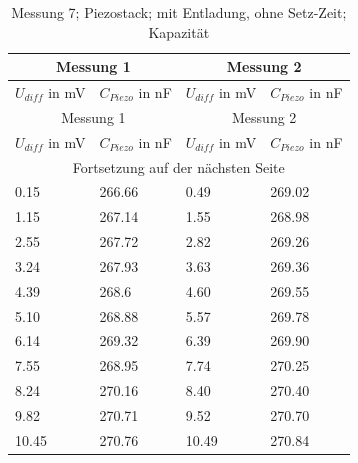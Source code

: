 \documentclass[12pt]{scrreprt} %
\begin{document}
\setlongtables
\begin{longtable}{| l | l | l | l |}
\caption[Messung 7; ohne Setz-Zeit; Kapazität]{Messung 7; Piezostack; mit Entladung, ohne Setz-Zeit; Kapazität}\\
\hline
\multicolumn{2}{|c|}{Messung 1} &\multicolumn{2}{|c|}{Messung 2}\\
\hline
$U_{diff}$ in mV&$C_{Piezo}$ in nF&$U_{diff}$ in mV&$C_{Piezo}$ in nF\\
\hline
\endfirsthead
\hline
\multicolumn{2}{|c|}{Messung 1} &\multicolumn{2}{|c|}{Messung 2}\\
\hline
$U_{diff}$ in mV&$C_{Piezo}$ in nF&$U_{diff}$ in mV&$C_{Piezo}$ in nF\\
\hline
\endhead
\hline
\multicolumn{4}{|c|}{Fortsetzung auf der nächsten Seite}\\
\hline
\endfoot
\hline \hline
\endlastfoot
\hline
\label{tab:2.7}%
0.15&266.66&0.49&269.02\\
1.15&267.14&1.55&268.98\\
2.55&267.72&2.82&269.26\\
3.24&267.93&3.63&269.36\\
4.39&268.6&4.60&269.55\\
5.10&268.88&5.57&269.78\\
6.14&269.32&6.39&269.90\\
7.55&268.95&7.74&270.25\\
8.24&270.16&8.40&270.40\\
9.82&270.71&9.52&270.70\\
10.45&270.76&10.49&270.84\\
\end{longtable}
\end{document}
